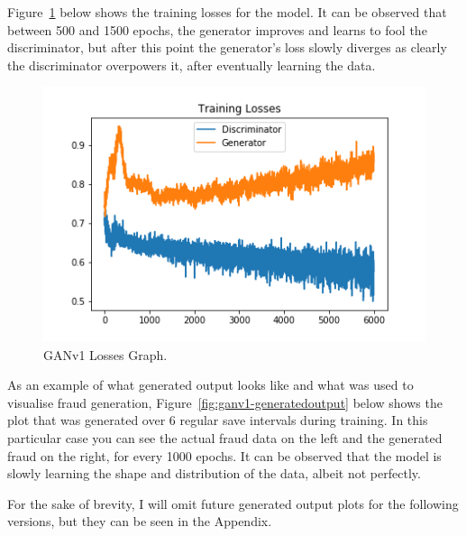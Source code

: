 \documentclass[12pt,a4paper,twoside]{report}
\begin{document}
Figure~\ref{fig:ganv1-losses} below shows the training losses for the model. It can be observed that between 500 and 1500 epochs, the generator improves and learns to fool the discriminator, but after this point the generator's loss slowly diverges as clearly the discriminator overpowers it, after eventually learning the data.

\begin{figure}[H]
\centering
\includegraphics[scale=0.6]{GANv1-losses}
\caption{GANv1 Losses Graph.}
\label{fig:ganv1-losses}
\end{figure}

As an example of what generated output looks like and what was used to visualise fraud generation, Figure~\ref{fig:ganv1-generatedoutput} below shows the plot that was generated over 6 regular save intervals during training. In this particular case you can see the actual fraud data on the left and the generated fraud on the right, for every 1000 epochs. It can be observed that the model is slowly learning the shape and distribution of the data, albeit not perfectly. 

For the sake of brevity, I will omit future generated output plots for the following versions, but they can be seen in the Appendix. 
\end{document}
